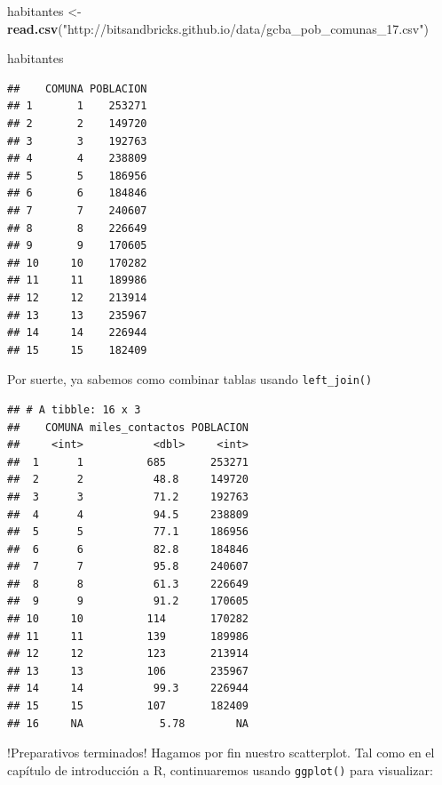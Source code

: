 \documentclass[]{book}
\newenvironment{Shaded}{\begin{snugshade}}{\end{snugshade}}
\newcommand{\KeywordTok}[1]{\textcolor[rgb]{0.13,0.29,0.53}{\textbf{#1}}}
\newcommand{\StringTok}[1]{\textcolor[rgb]{0.31,0.60,0.02}{#1}}
\newcommand{\OperatorTok}[1]{\textcolor[rgb]{0.81,0.36,0.00}{\textbf{#1}}}
\newcommand{\NormalTok}[1]{#1}
\begin{document}
\begin{Shaded}
\begin{Highlighting}[]
\NormalTok{habitantes <-}\StringTok{ }\KeywordTok{read.csv}\NormalTok{(}\StringTok{"http://bitsandbricks.github.io/data/gcba_pob_comunas_17.csv"}\NormalTok{)}

\NormalTok{habitantes}
\end{Highlighting}
\end{Shaded}

\begin{verbatim}
##    COMUNA POBLACION
## 1       1    253271
## 2       2    149720
## 3       3    192763
## 4       4    238809
## 5       5    186956
## 6       6    184846
## 7       7    240607
## 8       8    226649
## 9       9    170605
## 10     10    170282
## 11     11    189986
## 12     12    213914
## 13     13    235967
## 14     14    226944
## 15     15    182409
\end{verbatim}

Por suerte, ya sabemos como combinar tablas usando \texttt{left\_join()}

\begin{Shaded}
\end{Shaded}

\begin{verbatim}
## # A tibble: 16 x 3
##    COMUNA miles_contactos POBLACION
##     <int>           <dbl>     <int>
##  1      1          685       253271
##  2      2           48.8     149720
##  3      3           71.2     192763
##  4      4           94.5     238809
##  5      5           77.1     186956
##  6      6           82.8     184846
##  7      7           95.8     240607
##  8      8           61.3     226649
##  9      9           91.2     170605
## 10     10          114       170282
## 11     11          139       189986
## 12     12          123       213914
## 13     13          106       235967
## 14     14           99.3     226944
## 15     15          107       182409
## 16     NA            5.78        NA
\end{verbatim}

!Preparativos terminados! Hagamos por fin nuestro scatterplot. Tal como
en el capítulo de introducción a R, continuaremos usando
\texttt{ggplot()} para visualizar:
\end{document}
